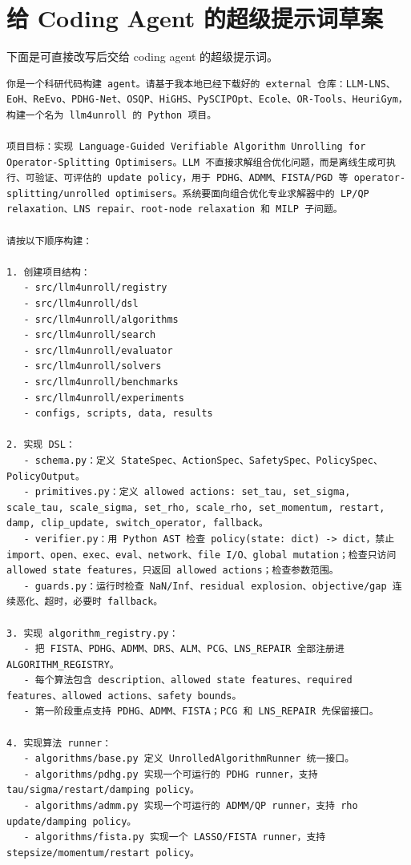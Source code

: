 \documentclass[12pt,a4paper]{ctexart}
\begin{document}
\section{给 Coding Agent 的超级提示词草案}

下面是可直接改写后交给 coding agent 的超级提示词。

\begin{lstlisting}[style=bashstyle]
你是一个科研代码构建 agent。请基于我本地已经下载好的 external 仓库：LLM-LNS、EoH、ReEvo、PDHG-Net、OSQP、HiGHS、PySCIPOpt、Ecole、OR-Tools、HeuriGym，构建一个名为 llm4unroll 的 Python 项目。

项目目标：实现 Language-Guided Verifiable Algorithm Unrolling for Operator-Splitting Optimisers。LLM 不直接求解组合优化问题，而是离线生成可执行、可验证、可评估的 update policy，用于 PDHG、ADMM、FISTA/PGD 等 operator-splitting/unrolled optimisers。系统要面向组合优化专业求解器中的 LP/QP relaxation、LNS repair、root-node relaxation 和 MILP 子问题。

请按以下顺序构建：

1. 创建项目结构：
   - src/llm4unroll/registry
   - src/llm4unroll/dsl
   - src/llm4unroll/algorithms
   - src/llm4unroll/search
   - src/llm4unroll/evaluator
   - src/llm4unroll/solvers
   - src/llm4unroll/benchmarks
   - src/llm4unroll/experiments
   - configs, scripts, data, results

2. 实现 DSL：
   - schema.py：定义 StateSpec、ActionSpec、SafetySpec、PolicySpec、PolicyOutput。
   - primitives.py：定义 allowed actions: set_tau, set_sigma, scale_tau, scale_sigma, set_rho, scale_rho, set_momentum, restart, damp, clip_update, switch_operator, fallback。
   - verifier.py：用 Python AST 检查 policy(state: dict) -> dict，禁止 import、open、exec、eval、network、file I/O、global mutation；检查只访问 allowed state features，只返回 allowed actions；检查参数范围。
   - guards.py：运行时检查 NaN/Inf、residual explosion、objective/gap 连续恶化、超时，必要时 fallback。

3. 实现 algorithm_registry.py：
   - 把 FISTA、PDHG、ADMM、DRS、ALM、PCG、LNS_REPAIR 全部注册进 ALGORITHM_REGISTRY。
   - 每个算法包含 description、allowed state features、required features、allowed actions、safety bounds。
   - 第一阶段重点支持 PDHG、ADMM、FISTA；PCG 和 LNS_REPAIR 先保留接口。

4. 实现算法 runner：
   - algorithms/base.py 定义 UnrolledAlgorithmRunner 统一接口。
   - algorithms/pdhg.py 实现一个可运行的 PDHG runner，支持 tau/sigma/restart/damping policy。
   - algorithms/admm.py 实现一个可运行的 ADMM/QP runner，支持 rho update/damping policy。
   - algorithms/fista.py 实现一个 LASSO/FISTA runner，支持 stepsize/momentum/restart policy。


\end{lstlisting}
\end{document}
